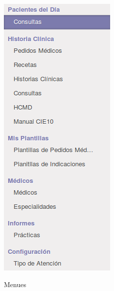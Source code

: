 \begin{correccionFigure}[h]
      \centering
      \includegraphics[height=.3\textheight]{img/tp1/HE/MenuHC}
      \caption{Menues}
      \label{submenu}
\end{correccionFigure}

